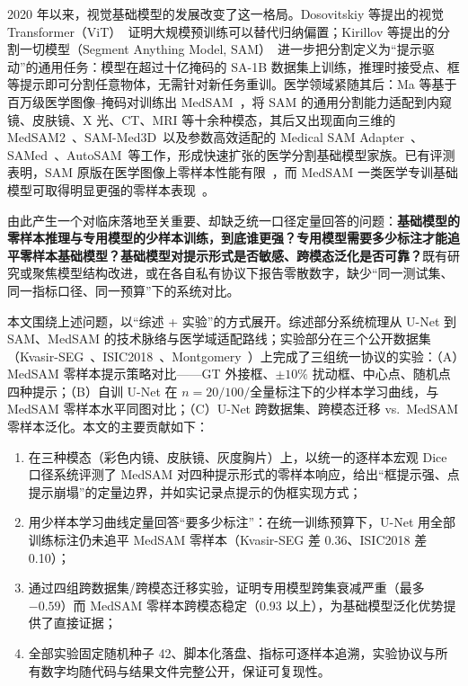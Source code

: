 \documentclass[zihao=-4,a4paper]{ctexart}
\begin{document}
2020 年以来，视觉基础模型的发展改变了这一格局。Dosovitskiy 等提出的视觉 Transformer（ViT）~\cite{dosovitskiy2021vit}证明大规模预训练可以替代归纳偏置；Kirillov 等提出的分割一切模型（Segment Anything Model, SAM）~\cite{kirillov2023segment}进一步把分割定义为``提示驱动''的通用任务：模型在超过十亿掩码的 SA-1B 数据集上训练，推理时接受点、框等提示即可分割任意物体，无需针对新任务重训。医学领域紧随其后：Ma 等基于百万级医学图像--掩码对训练出 MedSAM~\cite{ma2024segment}，将 SAM 的通用分割能力适配到内窥镜、皮肤镜、X 光、CT、MRI 等十余种模态，其后又出现面向三维的 MedSAM2~\cite{ma2025medsam2}、SAM-Med3D~\cite{wang2023sammed3d}以及参数高效适配的 Medical SAM Adapter~\cite{wu2023medsamadapter}、SAMed~\cite{zhang2023samed}、AutoSAM~\cite{shaharabany2023autosam}等工作，形成快速扩张的医学分割基础模型家族。已有评测表明，SAM 原版在医学图像上零样本性能有限~\cite{huang2024sam}，而 MedSAM 一类医学专训基础模型可取得明显更强的零样本表现~\cite{koishiyeva2025review,gu2025how}。

由此产生一个对临床落地至关重要、却缺乏统一口径定量回答的问题：\textbf{基础模型的零样本推理与专用模型的少样本训练，到底谁更强？专用模型需要多少标注才能追平零样本基础模型？基础模型对提示形式是否敏感、跨模态泛化是否可靠？}既有研究或聚焦模型结构改进，或在各自私有协议下报告零散数字，缺少``同一测试集、同一指标口径、同一预算''下的系统对比。

本文围绕上述问题，以``综述 + 实验''的方式展开。综述部分系统梳理从 U-Net 到 SAM、MedSAM 的技术脉络与医学域适配路线；实验部分在三个公开数据集（Kvasir-SEG~\cite{jha2020kvasir}、ISIC2018~\cite{codella2019skin}、Montgomery~\cite{jaeger2014two}）上完成了三组统一协议的实验：（A）MedSAM 零样本提示策略对比——GT 外接框、$\pm10\%$ 扰动框、中心点、随机点四种提示；（B）自训 U-Net 在 $n=20/100/$全量标注下的少样本学习曲线，与 MedSAM 零样本水平同图对比；（C）U-Net 跨数据集、跨模态迁移 vs.\ MedSAM 零样本泛化。本文的主要贡献如下：

\begin{enumerate}[itemsep=0.1ex]
  \item 在三种模态（彩色内镜、皮肤镜、灰度胸片）上，以统一的逐样本宏观 Dice 口径系统评测了 MedSAM 对四种提示形式的零样本响应，给出``框提示强、点提示崩塌''的定量边界，并如实记录点提示的伪框实现方式；
  \item 用少样本学习曲线定量回答``要多少标注''：在统一训练预算下，U-Net 用全部训练标注仍未追平 MedSAM 零样本（Kvasir-SEG 差 0.36、ISIC2018 差 0.10）；
  \item 通过四组跨数据集/跨模态迁移实验，证明专用模型跨集衰减严重（最多 $-0.59$）而 MedSAM 零样本跨模态稳定（0.93 以上），为基础模型泛化优势提供了直接证据；
  \item 全部实验固定随机种子 42、脚本化落盘、指标可逐样本追溯，实验协议与所有数字均随代码与结果文件完整公开，保证可复现性。
\end{enumerate}
\end{document}
